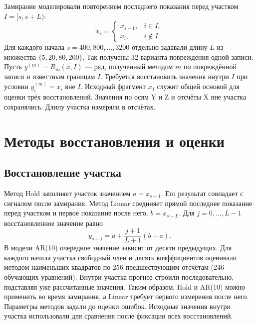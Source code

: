 \documentclass{misisarticle}
\begin{document}
Замирание моделировали повторением последнего показания перед участком $I=[s,s+L)$:
\begin{equation}
\widetilde{x}_i=\begin{cases}
x_{s-1}, & i\in I,\\
x_i, & i\notin I.
\end{cases}
\label{eq:freeze}
\end{equation}
Для каждого начала $s=400,800,\ldots,3200$ отдельно задавали длину $L$ из множества $\{5,20,80,200\}$. Так получены 32 варианта повреждения одной записи. Пусть $y^{(m)}=R_m(\widetilde{x},I)$ --- ряд, полученный методом $m$ по повреждённой записи и известным границам $I$. Требуется восстановить значения внутри $I$ при условии $y^{(m)}_i=x_i$ вне $I$. Исходный фрагмент $x_I$ служит общей основой для оценки трёх восстановлений. Значения по осям Y и Z и отсчёты X вне участка сохранялись. Длину участка измеряли в отсчётах.

\section{Методы восстановления и оценки}
\subsection{Восстановление участка}
Метод Hold заполняет участок значением $a=x_{s-1}$. Его результат совпадает с сигналом после замирания. Метод Linear соединяет прямой последнее показание перед участком и первое показание после него, $b=x_{s+L}$. Для $j=0,\ldots,L-1$ восстановленное значение равно
\[
y_{s+j}=a+\frac{j+1}{L+1}(b-a).
\]
В модели AR(10) очередное значение зависит от десяти предыдущих. Для каждого начала участка свободный член и десять коэффициентов оценивали методом наименьших квадратов по 256 предшествующим отсчётам (246 обучающих уравнений). Внутри участка прогноз строили последовательно, подставляя уже рассчитанные значения. Таким образом, Hold и AR(10) можно применить во время замирания, а Linear требует первого измерения после него. Параметры методов задали до оценки ошибок. Исходные значения внутри участка использовали для сравнения после фиксации всех восстановлений.
\end{document}
